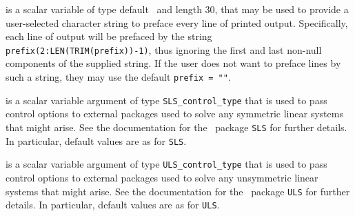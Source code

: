 \documentclass{galahad}
\begin{document}
\begin{description}
 is a scalar variable of type default \character\
and length 30, that may be used to provide a user-selected
character string to preface every line of printed output.
Specifically, each line of output will be prefaced by the string
{\tt prefix(2:LEN(TRIM(prefix))-1)},
thus ignoring the first and last non-null components of the
supplied string. If the user does not want to preface lines by such
a string, they may use the default {\tt prefix = ""}.

 is a scalar variable argument of type
{\tt SLS\_control\_type} that is used to pass control
options to external packages used to solve any symmetric
linear systems that might arise.
See the documentation for the \galahad\ package {\tt SLS} for further details.
In particular, default values are as for {\tt SLS}.

 is a scalar variable argument of type
{\tt ULS\_control\_type} that is used to pass control
options to external packages used to solve any unsymmetric
linear systems that might arise.
See the documentation for the \galahad\ package {\tt ULS} for further details.
In particular, default values are as for {\tt ULS}.

\end{description}

\end{document}
